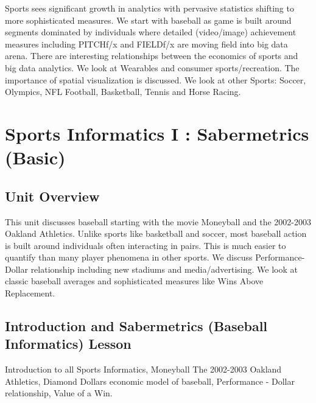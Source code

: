 

\label{sports-case-study}

\FILENAME

Sports sees significant growth in analytics with pervasive statistics
shifting to more sophisticated measures. We start with baseball as game
is built around segments dominated by individuals where detailed
(video/image) achievement measures including PITCHf/x and FIELDf/x are
moving field into big data arena. There are interesting relationships
between the economics of sports and big data analytics. We look at
Wearables and consumer sports/recreation. The importance of spatial
visualization is discussed. We look at other Sports: Soccer, Olympics,
NFL Football, Basketball, Tennis and Horse Racing.

\section{Sports Informatics I : Sabermetrics
(Basic)}\label{sports-informatics-i-sabermetrics-basic}

\subsection{Unit Overview}\label{unit-overview}

This unit discusses baseball starting with the movie Moneyball and the
2002-2003 Oakland Athletics. Unlike sports like basketball and soccer,
most baseball action is built around individuals often interacting in
pairs. This is much easier to quantify than many player phenomena in
other sports. We discuss Performance-Dollar relationship including new
stadiums and media/advertising. We look at classic baseball averages and
sophisticated measures like Wins Above Replacement.




\subsection{Introduction and Sabermetrics (Baseball Informatics)
Lesson}\label{introduction-and-sabermetrics-baseball-informatics-lesson}

Introduction to all Sports Informatics, Moneyball The 2002-2003 Oakland
Athletics, Diamond Dollars economic model of baseball, Performance -
Dollar relationship, Value of a Win.




